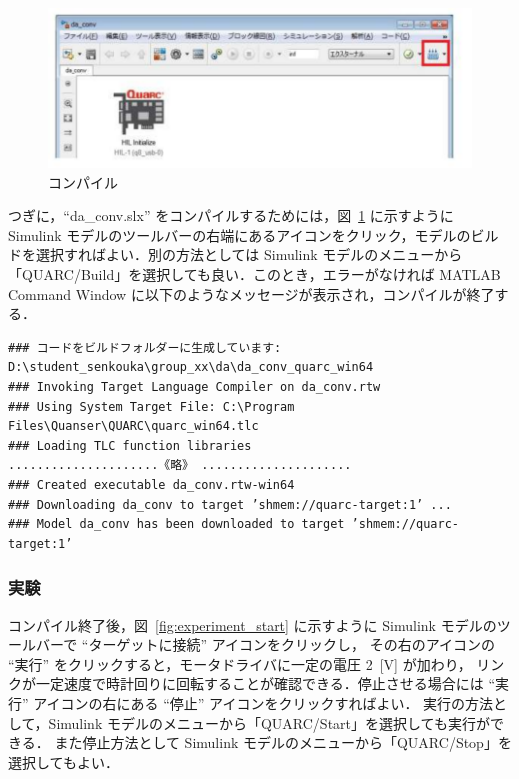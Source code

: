     \begin{figure}[H]
        \centering
        \includegraphics[width=0.8\linewidth]{figure/compile_button.pdf}
        \caption{コンパイル}
        \label{fig:compile_button}
    \end{figure}
    
    つぎに，“da\_conv.slx” をコンパイルするためには，図~\ref{fig:compile_button} に示すように Simulink モデルのツールバーの右端にあるアイコンをクリック，モデルのビルドを選択すればよい．別の方法としては Simulink モデルのメニューから「QUARC/Build」を選択しても良い．このとき，エラーがなければ MATLAB Command Window に以下のようなメッセージが表示され，コンパイルが終了する．
\footnotesize
\begin{verbatim}
### コードをビルドフォルダーに生成しています: D:\student_senkouka\group_xx\da\da_conv_quarc_win64
### Invoking Target Language Compiler on da_conv.rtw
### Using System Target File: C:\Program Files\Quanser\QUARC\quarc_win64.tlc
### Loading TLC function libraries
.....................《略》 .....................
### Created executable da_conv.rtw-win64
### Downloading da_conv to target ’shmem://quarc-target:1’ ...
### Model da_conv has been downloaded to target ’shmem://quarc-target:1’
\end{verbatim}

        \subsubsection{実験}

        コンパイル終了後，図~\ref{fig:experiment_start} に示すように Simulink モデルのツールバーで “ターゲットに接続” アイコンをクリックし，
        その右のアイコンの “実行” をクリックすると，モータドライバに一定の電圧 2~[V] が加わり，
        リンクが一定速度で時計回りに回転することが確認できる．停止させる場合には “実行” アイコンの右にある “停止” アイコンをクリックすればよい．
        実行の方法として，Simulink モデルのメニューから「QUARC/Start」を選択しても実行ができる．
        また停止方法として Simulink モデルのメニューから「QUARC/Stop」を選択してもよい．
        
